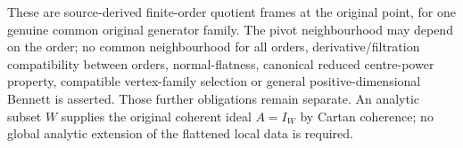 These are source-derived finite-order quotient frames at the original
point, for one genuine common original generator family. The pivot
neighbourhood may depend on the order; no common neighbourhood for
all orders, derivative/filtration compatibility between orders,
normal-flatness, canonical reduced centre-power property, compatible
vertex-family selection or general positive-dimensional Bennett is
asserted. Those further obligations remain separate. An analytic
subset $W$ supplies the original coherent ideal $A=I_W$ by Cartan
coherence; no global analytic extension of the flattened local data
is required.

